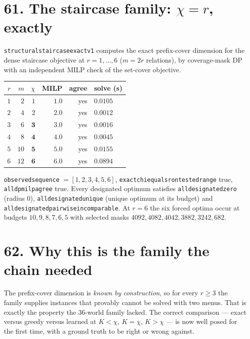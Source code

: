 \documentclass[9pt,twocolumn]{article}
\renewcommand{\_}{\CIGunderscore\allowbreak}
\begin{document}
\section*{61. The staircase family: $\chi=r$, exactly}
\texttt{structural\_staircase\_exact\_v1} computes the exact prefix-cover dimension for the dense staircase objective at $r=1,\dots,6$ ($m=2r$ relations), by coverage-mask DP with an independent MILP check of the set-cover objective.
\begin{center}\scriptsize
\begin{tabularx}{0.98\columnwidth}{r r r r r X}
\toprule
$r$ & $m$ & $\chi$ & MILP & agree & solve (s)\\
\midrule
$1$ & $2$ & $1$ & $1.0$ & yes & $0.0105$\\
$2$ & $4$ & $2$ & $2.0$ & yes & $0.0012$\\
$3$ & $6$ & $\mathbf{3}$ & $3.0$ & yes & $0.0016$\\
$4$ & $8$ & $\mathbf{4}$ & $4.0$ & yes & $0.0045$\\
$5$ & $10$ & $\mathbf{5}$ & $5.0$ & yes & $0.0155$\\
$6$ & $12$ & $\mathbf{6}$ & $6.0$ & yes & $0.0894$\\
\bottomrule
\end{tabularx}
\end{center}
\texttt{observed\_sequence} $=[1,2,3,4,5,6]$, \texttt{exact\_chi\_equals\_r\_on\_tested\_range} true, \texttt{all\_dp\_milp\_agree} true. Every designated optimum satisfies \texttt{all\_designated\_zero} (radius $0$), \texttt{all\_designated\_unique} (unique optimum at its budget) and \texttt{all\_designated\_pairwise\_incomparable}. At $r=6$ the six forced optima occur at budgets $10,9,8,7,6,5$ with selected masks $4092,4082,4042,3882,3242,682$.

\section*{62. Why this is the family the chain needed}
The prefix-cover dimension is \emph{known by construction}, so for every $r\ge3$ the family supplies instances that provably cannot be solved with two menus. That is exactly the property the $36$-world family lacked. The correct comparison --- exact versus greedy versus learned at $K<\chi$, $K=\chi$, $K>\chi$ --- is now well posed for the first time, with a ground truth to be right or wrong against.
\end{document}

